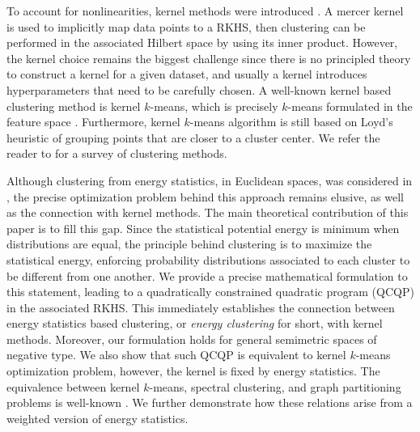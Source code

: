 \documentclass[aps,preprint,nofootinbib,floatfix]{revtex4-1}
\begin{document}
To account for nonlinearities, kernel methods were introduced 
\cite{Smola,Girolami}. A mercer kernel \cite{Mercer} is used to implicitly
map data points to a RKHS, then clustering can be performed in the associated
Hilbert space by using its inner product. However, the kernel choice remains 
the biggest challenge since there is no principled theory to construct a kernel
for a given dataset, and usually a kernel introduces hyperparameters that 
need to be carefully chosen. A well-known kernel based clustering method
is kernel $k$-means, which is precisely $k$-means 
formulated in the feature space \cite{Girolami}. 
Furthermore, kernel $k$-means algorithm
\cite{Dhillon2,Dhillon} is still based on Loyd's heuristic \cite{Lloyd}
of grouping points that are closer to a cluster center.
We refer the reader to \cite{Filippone} for a survey of clustering
methods.

Although clustering from energy statistics, in Euclidean spaces,
was considered in \cite{Kgroups}, 
the precise optimization problem behind this approach
remains elusive, as well as the connection with kernel methods.
The main theoretical contribution of this paper is to fill this gap.
Since the statistical potential energy is minimum when
distributions are equal, the principle behind clustering is to maximize 
the statistical energy,  enforcing probability distributions associated to 
each cluster to be different from one another. We provide a precise 
mathematical formulation to this statement, leading to a quadratically 
constrained quadratic program (QCQP) in the associated RKHS. This immediately
establishes the connection between energy statistics based clustering,
or \emph{energy clustering} for short, with kernel methods. Moreover,
our formulation holds for general semimetric spaces of negative type.
We also show that such QCQP is equivalent to kernel $k$-means 
optimization problem, however, the kernel is fixed by 
energy statistics.
The equivalence between kernel $k$-means, spectral clustering, and graph 
partitioning problems is well-known \cite{Dhillon,Dhillon2}. We further
demonstrate 
how these relations arise from a weighted version of energy statistics.
\end{document}
